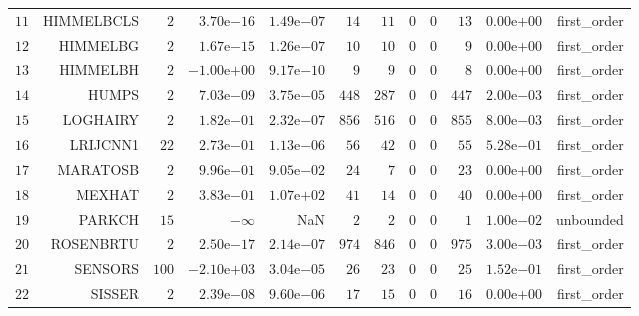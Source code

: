 \begin{longtable}{rrrrrrrrrrrr}
  \(    11\) & HIMMELBCLS & \(     2\) & \( 3.70\)e\(-16\) & \( 1.49\)e\(-07\) & \(    14\) & \(    11\) & \(     0\) & \(     0\) & \(    13\) & \( 0.00\)e\(+00\) & first\_order \\
  \(    12\) & HIMMELBG & \(     2\) & \( 1.67\)e\(-15\) & \( 1.26\)e\(-07\) & \(    10\) & \(    10\) & \(     0\) & \(     0\) & \(     9\) & \( 0.00\)e\(+00\) & first\_order \\
  \(    13\) & HIMMELBH & \(     2\) & \(-1.00\)e\(+00\) & \( 9.17\)e\(-10\) & \(     9\) & \(     9\) & \(     0\) & \(     0\) & \(     8\) & \( 0.00\)e\(+00\) & first\_order \\
  \(    14\) & HUMPS & \(     2\) & \( 7.03\)e\(-09\) & \( 3.75\)e\(-05\) & \(   448\) & \(   287\) & \(     0\) & \(     0\) & \(   447\) & \( 2.00\)e\(-03\) & first\_order \\
  \(    15\) & LOGHAIRY & \(     2\) & \( 1.82\)e\(-01\) & \( 2.32\)e\(-07\) & \(   856\) & \(   516\) & \(     0\) & \(     0\) & \(   855\) & \( 8.00\)e\(-03\) & first\_order \\
  \(    16\) & LRIJCNN1 & \(    22\) & \( 2.73\)e\(-01\) & \( 1.13\)e\(-06\) & \(    56\) & \(    42\) & \(     0\) & \(     0\) & \(    55\) & \( 5.28\)e\(-01\) & first\_order \\
  \(    17\) & MARATOSB & \(     2\) & \( 9.96\)e\(-01\) & \( 9.05\)e\(-02\) & \(    24\) & \(     7\) & \(     0\) & \(     0\) & \(    23\) & \( 0.00\)e\(+00\) & first\_order \\
  \(    18\) & MEXHAT & \(     2\) & \( 3.83\)e\(-01\) & \( 1.07\)e\(+02\) & \(    41\) & \(    14\) & \(     0\) & \(     0\) & \(    40\) & \( 0.00\)e\(+00\) & first\_order \\
  \(    19\) & PARKCH & \(    15\) & \(-\infty\) &       NaN & \(     2\) & \(     2\) & \(     0\) & \(     0\) & \(     1\) & \( 1.00\)e\(-02\) & unbounded \\
  \(    20\) & ROSENBRTU & \(     2\) & \( 2.50\)e\(-17\) & \( 2.14\)e\(-07\) & \(   974\) & \(   846\) & \(     0\) & \(     0\) & \(   975\) & \( 3.00\)e\(-03\) & first\_order \\
  \(    21\) & SENSORS & \(   100\) & \(-2.10\)e\(+03\) & \( 3.04\)e\(-05\) & \(    26\) & \(    23\) & \(     0\) & \(     0\) & \(    25\) & \( 1.52\)e\(-01\) & first\_order \\
  \(    22\) & SISSER & \(     2\) & \( 2.39\)e\(-08\) & \( 9.60\)e\(-06\) & \(    17\) & \(    15\) & \(     0\) & \(     0\) & \(    16\) & \( 0.00\)e\(+00\) & first\_order \\

\end{longtable}
